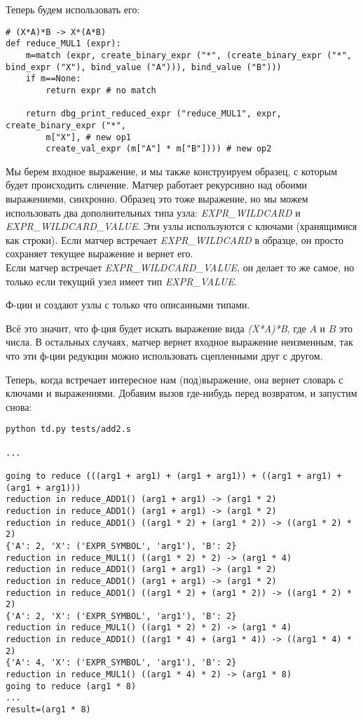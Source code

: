 Теперь будем использовать его:

\begin{lstlisting}
# (X*A)*B -> X*(A*B)
def reduce_MUL1 (expr):
    m=match (expr, create_binary_expr ("*", (create_binary_expr ("*", bind_expr ("X"), bind_value ("A"))), bind_value ("B")))
    if m==None:
        return expr # no match

    return dbg_print_reduced_expr ("reduce_MUL1", expr, create_binary_expr ("*", 
        m["X"], # new op1
        create_val_expr (m["A"] * m["B"]))) # new op2
\end{lstlisting}

Мы берем входное выражение, и мы также конструируем образец, с которым будет происходить сличение.
Матчер работает рекурсивно над обоими выражениеми, синхронно.
Образец это тоже выражение, но мы можем использовать два дополнительных типа узла: \textit{EXPR\_WILDCARD} и
\textit{EXPR\_WILDCARD\_VALUE}. Эти узлы используются с ключами (хранящимися как строки).
Если матчер встречает \textit{EXPR\_WILDCARD} в образце, он просто сохраняет текущее выражение и вернет его.\\
Если матчер встречает \textit{EXPR\_WILDCARD\_VALUE}, он делает то же самое, но только если текущий узел имеет тип
\textit{EXPR\_VALUE}.

Ф-ции  и  создают узлы с только что описанными типами.

Всё это значит, что ф-ция  будет искать выражение вида \textit{(X*A)*B}, где $A$ и $B$
это числа. В остальных случаях, матчер вернет входное выражение неизменным, так что эти ф-ции редукции можно использовать
сцепленными друг с другом.

Теперь, когда  встречает интересное нам (под)выражение,
она вернет словарь с ключами и выражениями.
Добавим вызов  где-нибудь перед возвратом, и запустим снова:

\begin{lstlisting}
python td.py tests/add2.s

...

going to reduce (((arg1 + arg1) + (arg1 + arg1)) + ((arg1 + arg1) + (arg1 + arg1)))
reduction in reduce_ADD1() (arg1 + arg1) -> (arg1 * 2)
reduction in reduce_ADD1() (arg1 + arg1) -> (arg1 * 2)
reduction in reduce_ADD1() ((arg1 * 2) + (arg1 * 2)) -> ((arg1 * 2) * 2)
{'A': 2, 'X': ('EXPR_SYMBOL', 'arg1'), 'B': 2}
reduction in reduce_MUL1() ((arg1 * 2) * 2) -> (arg1 * 4)
reduction in reduce_ADD1() (arg1 + arg1) -> (arg1 * 2)
reduction in reduce_ADD1() (arg1 + arg1) -> (arg1 * 2)
reduction in reduce_ADD1() ((arg1 * 2) + (arg1 * 2)) -> ((arg1 * 2) * 2)
{'A': 2, 'X': ('EXPR_SYMBOL', 'arg1'), 'B': 2}
reduction in reduce_MUL1() ((arg1 * 2) * 2) -> (arg1 * 4)
reduction in reduce_ADD1() ((arg1 * 4) + (arg1 * 4)) -> ((arg1 * 4) * 2)
{'A': 4, 'X': ('EXPR_SYMBOL', 'arg1'), 'B': 2}
reduction in reduce_MUL1() ((arg1 * 4) * 2) -> (arg1 * 8)
going to reduce (arg1 * 8)
...
result=(arg1 * 8)
\end{lstlisting}


